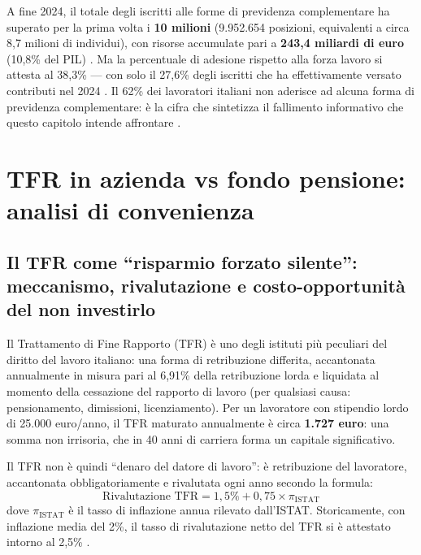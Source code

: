 \medskip
\noindent
A fine 2024, il totale degli iscritti alle forme di previdenza
complementare ha superato per la prima volta i \textbf{10 milioni}
(9.952.654 posizioni, equivalenti a circa 8,7 milioni di individui),
con risorse accumulate pari a \textbf{243,4 miliardi di euro}
(10,8\% del PIL) \cite{web:65, COVIP2025}.
Ma la percentuale di adesione rispetto alla forza lavoro si attesta
al 38,3\% — con solo il 27,6\% degli iscritti che ha effettivamente
versato contributi nel 2024 \cite{web:85}.
Il 62\% dei lavoratori italiani non aderisce ad alcuna forma di
previdenza complementare: è la cifra che sintetizza il fallimento
informativo che questo capitolo intende affrontare \cite{web:76}.


\section{TFR in azienda vs fondo pensione: analisi di convenienza}
\label{sec:tfr_fondo}

\subsection{Il TFR come ``risparmio forzato silente'':
            meccanismo, rivalutazione e costo-opportunità
            del non investirlo}
\label{sub:tfr_meccanismo}

\noindent
Il Trattamento di Fine Rapporto (TFR) è uno degli istituti più peculiari
del diritto del lavoro italiano: una forma di retribuzione differita,
accantonata annualmente in misura pari al 6,91\% della retribuzione
lorda e liquidata al momento della cessazione del rapporto di lavoro
(per qualsiasi causa: pensionamento, dimissioni, licenziamento).
Per un lavoratore con stipendio lordo di 25.000 euro/anno, il TFR
maturato annualmente è circa \textbf{1.727 euro}: una somma non irrisoria,
che in 40 anni di carriera forma un capitale significativo.

\medskip
\noindent
Il TFR non è quindi ``denaro del datore di lavoro'': è retribuzione
del lavoratore, accantonata obbligatoriamente e rivalutata ogni anno
secondo la formula:
\begin{equation}
    \text{Rivalutazione TFR} = 1{,}5\% + 0{,}75 \times \pi_{\text{ISTAT}}
    \label{eq:rivalutazione_tfr}
\end{equation}
dove $\pi_{\text{ISTAT}}$ è il tasso di inflazione annua rilevato dall'ISTAT.
Storicamente, con inflazione media del 2\%, il tasso di rivalutazione
netto del TFR si è attestato intorno al 2,5\% \cite{web:86, web:65}.

